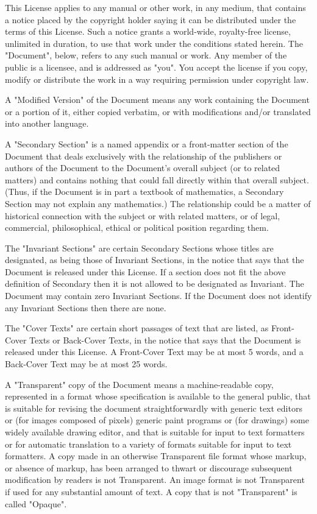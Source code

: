 \documentclass{book}
\begin{document}
This License applies to any manual or other work, in any medium, that
contains a notice placed by the copyright holder saying it can be
distributed under the terms of this License. Such a notice grants a
world-wide, royalty-free license, unlimited in duration, to use that
work under the conditions stated herein. The "Document", below, refers
to any such manual or work. Any member of the public is a licensee,
and is addressed as "you". You accept the license if you copy, modify
or distribute the work in a way requiring permission under copyright
law.

A "Modified Version" of the Document means any work containing the
Document or a portion of it, either copied verbatim, or with
modifications and/or translated into another language.

A "Secondary Section" is a named appendix or a front-matter section of
the Document that deals exclusively with the relationship of the
publishers or authors of the Document to the Document's overall
subject (or to related matters) and contains nothing that could fall
directly within that overall subject. (Thus, if the Document is in
part a textbook of mathematics, a Secondary Section may not explain
any mathematics.) The relationship could be a matter of historical
connection with the subject or with related matters, or of legal,
commercial, philosophical, ethical or political position regarding
them.

The "Invariant Sections" are certain Secondary Sections whose titles
are designated, as being those of Invariant Sections, in the notice
that says that the Document is released under this License. If a
section does not fit the above definition of Secondary then it is not
allowed to be designated as Invariant. The Document may contain zero
Invariant Sections. If the Document does not identify any Invariant
Sections then there are none.

The "Cover Texts" are certain short passages of text that are listed,
as Front-Cover Texts or Back-Cover Texts, in the notice that says that
the Document is released under this License. A Front-Cover Text may be
at most 5 words, and a Back-Cover Text may be at most 25 words.

A "Transparent" copy of the Document means a machine-readable copy,
represented in a format whose specification is available to the
general public, that is suitable for revising the document
straightforwardly with generic text editors or (for images composed of
pixels) generic paint programs or (for drawings) some widely available
drawing editor, and that is suitable for input to text formatters or
for automatic translation to a variety of formats suitable for input
to text formatters. A copy made in an otherwise Transparent file
format whose markup, or absence of markup, has been arranged to thwart
or discourage subsequent modification by readers is not Transparent.
An image format is not Transparent if used for any substantial amount
of text. A copy that is not "Transparent" is called "Opaque".
\end{document}
